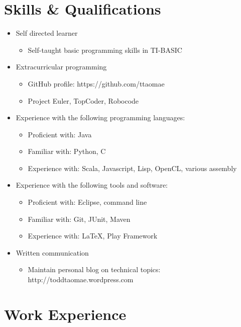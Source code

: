 \documentclass{resume}
\begin{document}
\section{Skills \& Qualifications}
\begin{itemize}
    \item{Self directed learner}
    \begin{itemize}
        \item{Self-taught basic programming skills in TI-BASIC}
    \end{itemize}

    \item{Extracurricular programming}
    \begin{itemize}
        \item{GitHub profile: https://github.com/ttaomae}
        \item{Project Euler, TopCoder, Robocode}
    \end{itemize}

    \item{Experience with the following programming languages:}
    \begin{itemize}
        \item{Proficient with: Java}
        \item{Familiar with: Python, C}
        \item{Experience with: Scala, Javascript, Lisp, OpenCL, various assembly}
    \end{itemize}

    \item{Experience with the following tools and software:}
    \begin{itemize}
        \item{Proficient with: Eclipse, command line}
        \item{Familiar with: Git, JUnit, Maven}
        \item{Experience with: \LaTeX, Play Framework}
    \end{itemize}

    \item{Written communication}
    \begin{itemize}
        \item{Maintain personal blog on technical topics: http://toddtaomae.wordpress.com}
    \end{itemize}
\end{itemize}


\section{Work Experience}
\end{document}
